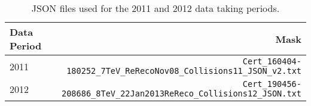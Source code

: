 \begin{table}[hbth]
\centering
\begin{tabular}{lr}
\hline
\textbf{Data Period} & \textbf{Mask} \\
\hline
2011 & \verb|Cert_160404-180252_7TeV_ReRecoNov08_Collisions11_JSON_v2.txt| \\
2012 & \verb|Cert_190456-208686_8TeV_22Jan2013ReReco_Collisions12_JSON.txt| \\
\hline
\end{tabular}
\caption{JSON files used for the 2011 and 2012 data taking periods.}
\label{tab:JSONfiles}
\end{table}
